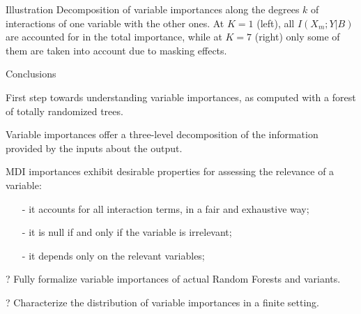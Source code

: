 \documentclass[final]{beamer}
\newcommand{\cmark}{\ding{51}}%
\begin{document}
\begin{frame}{}
\begin{textblock}{0.32}
\begin{block}{Illustration \phantom{p}}
Decomposition of variable importances along the
degrees $k$ of interactions of one variable with the other ones. At $K=1$ (left), all
$I(X_m;Y|B)$ are accounted for in the total importance, while at $K=7$ (right) only
some of them are taken into account due to masking effects.


\end{block}

\vspace{0.5cm}
\begin{block}{Conclusions \phantom{p}}

{\color{green} \cmark} First step towards understanding variable importances, as computed with a forest of totally randomized trees.

{\color{green} \cmark} Variable importances offer a three-level decomposition of the information provided by the inputs about the output.

{\color{green} \cmark} MDI importances exhibit desirable properties for assessing the relevance of a variable:
\begin{itemize}
\item[-] it accounts for all interaction terms, in a fair and exhaustive way;
\item[-] it is null if and only if the variable is irrelevant;
\item[-] it depends only on the relevant variables;
\end{itemize}

{\color{blue} ?} Fully formalize variable importances of actual Random Forests and variants.

{\color{blue} ?} Characterize the distribution of variable importances in a finite setting.


\end{block}

\end{textblock}




\end{frame}
\end{document}
